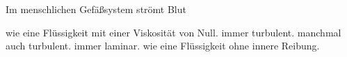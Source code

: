 \documentclass[11pt]{exam}
\begin{document}
\begin{questions}
\vspace{3mm}\question Im menschlichen Gefäßsystem strömt Blut

\begin{choices}
	\choice wie eine Flüssigkeit mit einer Viskosität von Null.
	\choice immer turbulent.
	\choice manchmal auch turbulent.
	\choice immer laminar.
	\choice wie eine Flüssigkeit ohne innere Reibung.
\end{choices}

\vspace{3mm}\end{questions}
\end{document}
